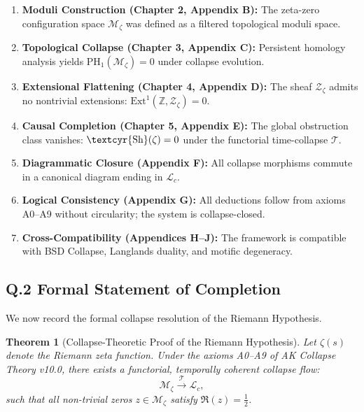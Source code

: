 \documentclass[11pt]{article}
\newtheorem{theorem}{Theorem}[section]
\newcommand{\Sha}{\text{\textcyr{Sh}}}
\begin{document}
\begin{enumerate}
    \item \textbf{Moduli Construction (Chapter 2, Appendix B):}  
    The zeta-zero configuration space $\mathcal{M}_\zeta$ was defined as a filtered topological moduli space.
    
    \item \textbf{Topological Collapse (Chapter 3, Appendix C):}  
    Persistent homology analysis yields $\mathrm{PH}_1(\mathcal{M}_\zeta) = 0$ under collapse evolution.

    \item \textbf{Extensional Flattening (Chapter 4, Appendix D):}  
    The sheaf $\mathcal{Z}_\zeta$ admits no nontrivial extensions: $\mathrm{Ext}^1(\mathbb{Z}, \mathcal{Z}_\zeta) = 0$.

    \item \textbf{Causal Completion (Chapter 5, Appendix E):}  
    The global obstruction class vanishes: $\Sha(\zeta) = 0$ under the functorial time-collapse $\mathcal{T}$.

    \item \textbf{Diagrammatic Closure (Appendix F):}  
    All collapse morphisms commute in a canonical diagram ending in $\mathcal{L}_c$.

    \item \textbf{Logical Consistency (Appendix G):}  
    All deductions follow from axioms A0–A9 without circularity; the system is collapse-closed.

    \item \textbf{Cross-Compatibility (Appendices H–J):}  
    The framework is compatible with BSD Collapse, Langlands duality, and motific degeneracy.
\end{enumerate}

\subsection*{Q.2 Formal Statement of Completion}

We now record the formal collapse resolution of the Riemann Hypothesis.

\begin{theorem}[Collapse-Theoretic Proof of the Riemann Hypothesis]
Let $\zeta(s)$ denote the Riemann zeta function. Under the axioms A0–A9 of AK Collapse Theory v10.0,  
there exists a functorial, temporally coherent collapse flow:
\[
\mathcal{M}_\zeta \xrightarrow{\mathcal{T}} \mathcal{L}_c,
\]
such that all non-trivial zeros $z \in \mathcal{M}_\zeta$ satisfy $\Re(z) = \tfrac{1}{2}$.
\end{theorem}
\end{document}
